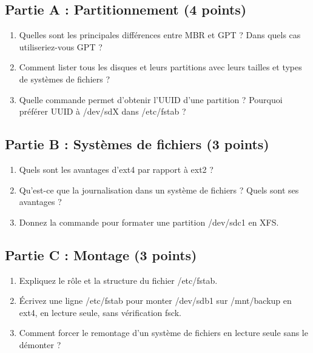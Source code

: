 \documentclass[12pt,a4paper]{article}
\begin{document}
\begin{questionbox}
\subsection*{Partie A : Partitionnement (4 points)}
\begin{enumerate}[label=\alph*)]
    \item Quelles sont les principales différences entre MBR et GPT ? Dans quels cas utiliseriez-vous GPT ?
    \item Comment lister tous les disques et leurs partitions avec leurs tailles et types de systèmes de fichiers ?
    \item Quelle commande permet d'obtenir l'UUID d'une partition ? Pourquoi préférer UUID à /dev/sdX dans /etc/fstab ?
\end{enumerate}

\subsection*{Partie B : Systèmes de fichiers (3 points)}
\begin{enumerate}[label=\alph*)]
    \item Quels sont les avantages d'ext4 par rapport à ext2 ?
    \item Qu'est-ce que la journalisation dans un système de fichiers ? Quels sont ses avantages ?
    \item Donnez la commande pour formater une partition /dev/sdc1 en XFS.
\end{enumerate}

\subsection*{Partie C : Montage (3 points)}
\begin{enumerate}[label=\alph*)]
    \item Expliquez le rôle et la structure du fichier /etc/fstab.
    \item Écrivez une ligne /etc/fstab pour monter /dev/sdb1 sur /mnt/backup en ext4, en lecture seule, sans vérification fsck.
    \item Comment forcer le remontage d'un système de fichiers en lecture seule sans le démonter ?
\end{enumerate}
\end{questionbox}

\newpage

\end{document}
